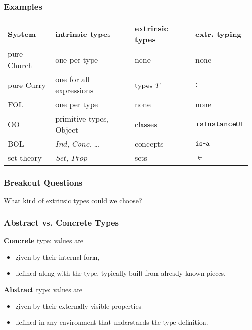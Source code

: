 \begin{frame}\frametitle{Examples}
\begin{center}
\begin{tabular}{l|lll}
System & intrinsic types & extrinsic types & extr. typing \\
\hline
pure Church & one per type & none & none \\
pure Curry & one for all expressions & types $T$ & $:$ \\
FOL & one per type & none & none \\
OO & primitive types, Object & classes & $\mathtt{isInstanceOf}$\\ 
BOL & $Ind$, $Conc$, \ldots & concepts & $\mathop{\texttt{is-a}}$\\
set theory & $Set$, $Prop$ & sets & $\in$ \\
\end{tabular}
\end{center}
\end{frame}

\begin{frame}\frametitle{Breakout Questions}
What kind of extrinsic types could we choose?
\end{frame}


\begin{frame}\frametitle{Abstract vs. Concrete Types}
\textbf{Concrete} type: values are
\begin{itemize}
\item given by their internal form,
\item defined along with the type, typically built from already-known pieces.
\end{itemize}

\textbf{Abstract} type: values are
\begin{itemize}
\item given by their externally visible properties,
\item defined in any environment that understands the type definition.
\end{itemize}
\end{frame}

